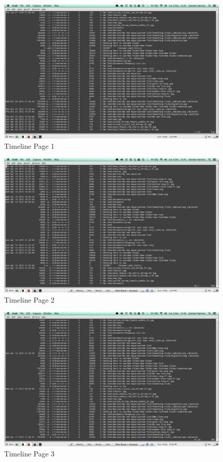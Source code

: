 \documentclass[12pt]{article}
\begin{document}
				\begin{figure}[ht!]
					\centering
					\includegraphics[width=12cm]{Images/TimeLine1.png}
					\caption{Timeline Page 1}
				\end{figure}
				\begin{figure}[ht!]
					\centering
					\includegraphics[width=12cm]{Images/TimeLine2.png}
					\caption{Timeline Page 2}
				\end{figure}
				\begin{figure}[ht!]
					\centering
					\includegraphics[width=12cm]{Images/TimeLine3.png}
					\caption{Timeline Page 3}
				\end{figure}
\end{document}
